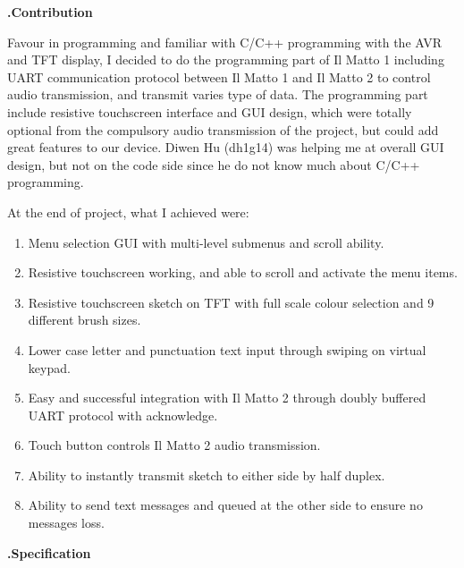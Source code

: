 \documentclass[a4paper,notitlepage,10pt]{report}
\newcommand{\tab}{\hspace{0.75cm}}
\newcommand{\fontHeading}{\fontsize{12pt}{13.2pt}\selectfont}
\newcommand{\fontBody}{\fontsize{10pt}{11pt}\selectfont}
\newcounter{sections}
\begin{document}
\columnsep=0.7cm
\begin{multicols}{2}

\fontHeading
{}
\textbf{\thesections.\tab Contribution}
\vspace{10pt}

\fontBody
Favour in programming and familiar with C/C++ programming with the AVR and TFT display, I decided to do the programming part of Il Matto 1 including UART communication protocol between Il Matto 1 and Il Matto 2 to control audio transmission, and transmit varies type of data. The programming part include resistive touchscreen interface and GUI design, which were totally optional from the compulsory audio transmission of the project, but could add great features to our device. Diwen Hu (dh1g14) was helping me at overall GUI design, but not on the code side since he do not know much about C/C++ programming.
\vspace{6pt}

At the end of project, what I achieved were:
\vspace{6pt}

\begin{enumerate}[label={\arabic*)},align=left,leftmargin=0.5cm,labelwidth=!,topsep=0pt,partopsep=0pt,parsep=0pt,itemsep=0pt]
\item Menu selection GUI with multi-level submenus and scroll ability.
\item Resistive touchscreen working, and able to scroll and activate the menu items.
\item Resistive touchscreen sketch on TFT with full scale colour selection and 9 different brush sizes.
\item Lower case letter and punctuation text input through swiping on virtual keypad.
\item Easy and successful integration with Il Matto 2 through doubly buffered UART protocol with acknowledge.
\item Touch button controls Il Matto 2 audio transmission.
\item Ability to instantly transmit sketch to either side by half duplex.
\item Ability to send text messages and queued at the other side to ensure no messages loss.
\end{enumerate}
\vspace{10pt}

\fontHeading
{}
\textbf{\thesections.\tab Specification}
\vspace{10pt}


\end{multicols}
\end{document}
